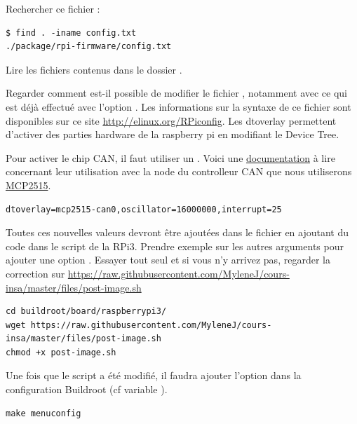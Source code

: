 Rechercher ce fichier :

\begin{verbatim}
$ find . -iname config.txt
./package/rpi-firmware/config.txt
\end{verbatim}

Lire les fichiers contenus dans le dossier .

Regarder comment est-il possible de modifier le fichier ,
notamment avec ce qui est déjà effectué avec l'option .
Les informations sur la syntaxe de ce fichier sont disponibles sur ce site
\url{http://elinux.org/RPiconfig}. Les dtoverlay permettent d'activer des
parties hardware de la raspberry pi en modifiant le Device Tree.

Pour activer le chip CAN, il faut utiliser un .
Voici une \href{https://github.com/raspberrypi/firmware/blob/master/boot/overlays/README#L56}{documentation}
à lire concernant leur utilisation avec la node du controlleur CAN que nous
utiliserons \href{https://github.com/raspberrypi/firmware/blob/master/boot/overlays/README#L1478..L1485}{MCP2515}.
\begin{verbatim}
dtoverlay=mcp2515-can0,oscillator=16000000,interrupt=25
\end{verbatim}

Toutes ces nouvelles valeurs devront être ajoutées dans le fichier 
en ajoutant du code dans le script  de la RPi3.
Prendre exemple sur les autres arguments pour ajouter une option
. Essayer tout seul et si vous n'y arrivez pas,
regarder la correction sur \url{https://raw.githubusercontent.com/MyleneJ/cours-insa/master/files/post-image.sh}

\begin{verbatim}
cd buildroot/board/raspberrypi3/
wget https://raw.githubusercontent.com/MyleneJ/cours-insa/master/files/post-image.sh
chmod +x post-image.sh
\end{verbatim}

Une fois que le script a été modifié, il faudra ajouter l'option dans la
configuration Buildroot (cf variable ).

\begin{verbatim}
make menuconfig
\end{verbatim}

